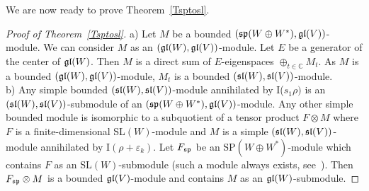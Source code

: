 \documentclass[12pt]{amsart}
\theoremstyle{definition}\newtheorem{theorem}{Theorem}[section]
\theoremstyle{definition}\newtheorem{definition}[proposition]{Definition}
\theoremstyle{remark}\newtheorem{example}[proposition]{Example}
\begin{document}
We are now ready to prove Theorem~\ref{Tsptosl}.
\begin{proof}[Proof of Theorem~\ref{Tsptosl}]a) Let $M$ be a bounded $(\frak{sp}(W\oplus W^*), \frak{gl}(V))$-module. We can consider $M$ as an $(\frak{gl}(W), \frak{gl}(V))$-module. Let $E$ be a generator of the center of $\frak{gl}(W)$. Then $M$ is a direct sum of $E$-eigenspaces $\oplus_{t\in\mathbb C}M_t$. As $M$ is a bounded $(\frak{gl}(W), \frak{gl}(V))$-module, $M_t$ is a bounded $(\frak{sl}(W), \frak{sl}(V))$-module.\\b) Any simple bounded $(\frak{sl}(W), \frak{sl}(V))$-module annihilated by I($s_1\rho)$ is an $(\frak{sl}(W), \frak{sl}(V))$-submodule of an $(\frak{sp}(W\oplus W^*), \frak{gl}(V))$-module. Any other simple bounded module is isomorphic to a subquotient of a tensor product $F\otimes M$ where $F$ is a finite-dimensional SL$(W)$-module and $M$ is a simple $(\frak{sl}(W), \frak{sl}(V))$-module annihilated by I$(\rho+\varepsilon_k)$. Let $F_\frak{sp}$ be an SP$(W\oplus W^*)$-module which contains $F$ as an SL$(W)$-submodule (such a module always exists, see~\cite{Gr}). Then $F_\frak{sp}\otimes M$ is a bounded $\frak{gl}(V)$-module and contains $M$ as an $\frak{gl}(W)$-submodule.\end{proof}
\end{document}
